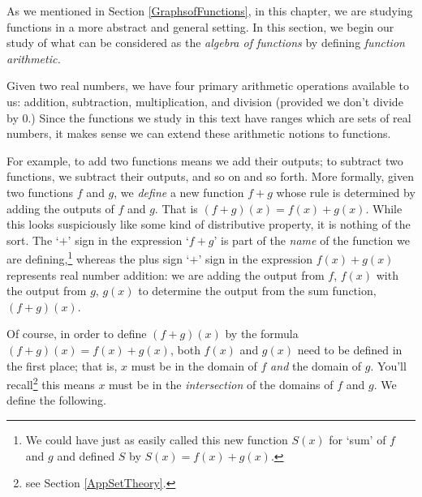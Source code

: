 \documentclass{ximera}
\begin{document}
	\author{Stitz-Zeager}




\setcounter{footnote}{0}

\label{FunctionArithmetic}

As we mentioned in Section \ref{GraphsofFunctions}, in this chapter, we are studying functions in a more abstract and general setting.  In this section, we begin our study of what can be considered as the \textit{algebra of functions}  by defining \textit{function arithmetic.}  

\smallskip


Given two real numbers,  we have four primary arithmetic operations available to us:  addition, subtraction, multiplication, and division (provided we don't divide by $0$.)  Since the functions we study in this text have ranges which are sets of real numbers, it makes sense we can extend these arithmetic notions to functions. 

\smallskip

For example,  to add two functions means  we add their outputs;  to subtract two functions, we subtract their outputs, and so on and so forth.  More formally, given two functions $f$ and $g$, we \textit{define} a new function $f+g$ whose rule is determined by adding the outputs of $f$ and $g$.  That is $(f+g)(x) = f(x) + g(x)$.  While  this looks suspiciously like some kind of distributive property, it is nothing of the sort.  The `$+$' sign in the expression `$f+g$' is part of the \textit{name} of the function we are defining,\footnote{We could have just as easily called this new function $S(x)$ for `sum' of $f$ and $g$ and defined $S$ by $S(x) = f(x) + g(x)$.} whereas the plus sign `$+$' sign in the expression $f(x) + g(x)$ represents real number addition: we are adding the output from $f$, $f(x)$ with the output from $g$, $g(x)$ to determine the output from the sum function, $(f+g)(x)$.

\smallskip

 Of course, in order to define $(f+g)(x)$ by the formula $(f+g)(x) = f(x) + g(x)$, both $f(x)$ and $g(x)$ need to be defined in the first place; that is, $x$ must be in the domain of $f$ \textit{and} the domain of $g$.  You'll recall\footnote{see Section \ref{AppSetTheory}.} this means $x$ must be in the \textit{intersection} of the domains of $f$ and $g$.   We define the following.
 
 \smallskip
\end{document}
